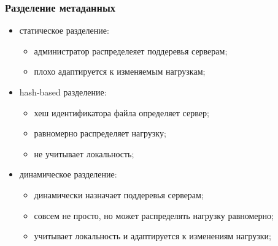 \begin{frame}
\frametitle{Разделение метаданных}
\begin{itemize}
  \item<1-> статическое разделение:
    \begin{itemize}
      \item администратор распределеяет поддеревья серверам;
      \item плохо адаптируется к изменяемым нагрузкам;
    \end{itemize}
  \item<2-> hash-based разделение:
    \begin{itemize}
      \item хеш идентификатора файла определяет сервер;
      \item равномерно распределяет нагрузку;
      \item не учитывает локальность;
    \end{itemize}
  \item<3-> динамическое разделение:
    \begin{itemize}
      \item динамически назначает поддеревья серверам;
      \item совсем не просто, но может распределять нагрузку равномерно;
      \item учитывает локальность и адаптируется к изменениям нагрузки;
    \end{itemize}
\end{itemize}
\end{frame}
